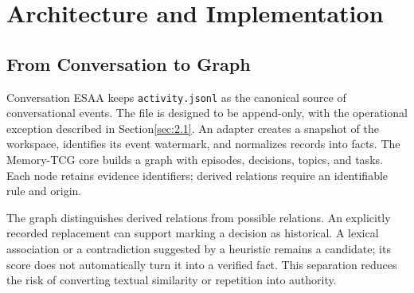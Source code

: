 \documentclass[11pt,a4paper]{article}
\begin{document}
\section{Architecture and Implementation}\label{sec:3}
\subsection{From Conversation to Graph}\label{sec:3.1}
Conversation ESAA keeps \texttt{activity.\allowbreak{}jsonl} as the canonical source of conversational events. The file is designed to be append-only, with the operational exception described in Section\nobreakspace{}\ref{sec:2.1}. An adapter creates a snapshot of the workspace, identifies its event watermark, and normalizes records into facts. The Memory-TCG core builds a graph with episodes, decisions, topics, and tasks. Each node retains evidence identifiers; derived relations require an identifiable rule and origin.

The graph distinguishes derived relations from possible relations. An explicitly recorded replacement can support marking a decision as historical. A lexical association or a contradiction suggested by a heuristic remains a candidate; its score does not automatically turn it into a verified fact. This separation reduces the risk of converting textual similarity or repetition into authority.
\end{document}
